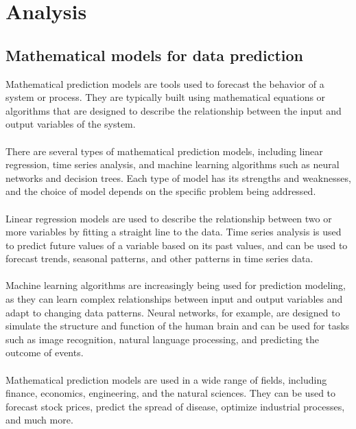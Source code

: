 \chapter{Analysis}\label{analysis}
      \section{Mathematical models for data prediction}
      Mathematical prediction models are tools used to forecast the behavior of a system
      or process. They are typically built using mathematical
      equations or algorithms that are designed to describe the relationship between
      the input and output variables of the system.\\
    \\
    There are several types of mathematical prediction models, including linear
    regression, time series analysis, and machine learning algorithms such as neural
    networks and decision trees. Each type of model has its strengths and weaknesses,
    and the choice of model depends on the specific problem being addressed.\\
    \\
    Linear regression models are used to describe the relationship between two or more
    variables by fitting a straight line to the data. Time series analysis is used
    to predict future values of a variable based on its past values, and can be used
    to forecast trends, seasonal patterns, and other patterns in time series data.\\
    \\
    Machine learning algorithms are increasingly being used for prediction modeling,
    as they can learn complex relationships between input and output variables and
    adapt to changing data patterns. Neural networks, for example, are designed
    to simulate the structure and function of the human brain and can be used for
    tasks such as image recognition, natural language processing, and predicting
    the outcome of events.\\
    \\
    Mathematical prediction models are used in a wide range of fields, including
    finance, economics, engineering, and the natural sciences. They can be used
    to forecast stock prices, predict the spread of disease, optimize industrial
    processes, and much more.
